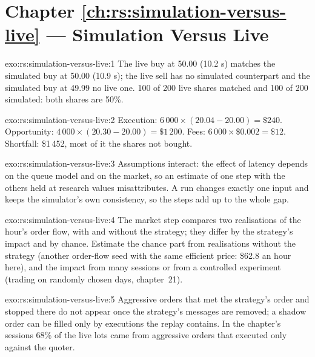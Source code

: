 \section*{Chapter \ref{ch:rs:simulation-versus-live} --- Simulation Versus Live}

\begin{solution}{exo:rs:simulation-versus-live:1}
The live buy at 50.00 (10.2 s) matches the simulated buy at 50.00 (10.9 s); the live sell has no simulated counterpart and the simulated buy at 49.99 no live one.
100 of 200 live shares matched and 100 of 200 simulated: both shares are 50\%.
\end{solution}

\begin{solution}{exo:rs:simulation-versus-live:2}
Execution: $6\,000 \times (20.04 - 20.00) = \$240$. Opportunity: $4\,000 \times (20.30 - 20.00) = \$1\,200$. Fees: $6\,000 \times \$0.002 = \$12$. Shortfall:
\$1\,452, most of it the shares not bought.
\end{solution}

\begin{solution}{exo:rs:simulation-versus-live:3}
Assumptions interact: the effect of latency depends on the queue model and on the market, so an estimate of one step with the others held at research values
misattributes. A run changes exactly one input and keeps the simulator's own consistency, so the steps add up to the whole gap.
\end{solution}

\begin{solution}{exo:rs:simulation-versus-live:4}
The market step compares two realisations of the hour's order flow, with and without the strategy; they differ by the strategy's impact and by chance. Estimate the
chance part from realisations without the strategy (another order-flow seed with the same efficient price: \$62.8 an hour here), and the impact from many sessions
or from a controlled experiment (trading on randomly chosen days, chapter~21).
\end{solution}

\begin{solution}{exo:rs:simulation-versus-live:5}
Aggressive orders that met the strategy's order and stopped there do not appear once the strategy's messages are removed; a shadow order can be filled only by
executions the replay contains. In the chapter's sessions 68\% of the live lots came from aggressive orders that executed only against the quoter.
\end{solution}

